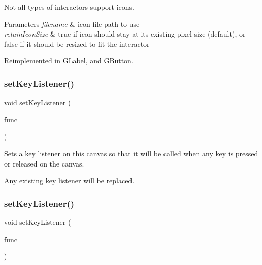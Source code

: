 Not all types of interactors support icons. 
\begin{DoxyParams}{Parameters}
{\em filename} & icon file path to use \\
\hline
{\em retain\+Icon\+Size} & true if icon should stay at its existing pixel size (default), or false if it should be resized to fit the interactor \\
\hline
\end{DoxyParams}


Reimplemented in \mbox{\hyperlink{classGLabel_a75753a3d7d3364185f8088d63b664cb1}{G\+Label}}, and \mbox{\hyperlink{classGButton_a75753a3d7d3364185f8088d63b664cb1}{G\+Button}}.

\mbox{\label{classGCanvas_aeb8324d3287fa1fbe093f4d6230cf0a6}} 
\subsubsection{\texorpdfstring{set\+Key\+Listener()}{setKeyListener()}\hspace{0.1cm}{\footnotesize\ttfamily [1/2]}}
{\footnotesize\ttfamily void set\+Key\+Listener (\begin{DoxyParamCaption}\item[{G\+Event\+Listener}]{func }\end{DoxyParamCaption})\hspace{0.3cm}{\ttfamily [virtual]}}



Sets a key listener on this canvas so that it will be called when any key is pressed or released on the canvas. 

Any existing key listener will be replaced. \mbox{\label{classGCanvas_ae48ecea73606c7bd9423e1c7cc589cc9}} 
\subsubsection{\texorpdfstring{set\+Key\+Listener()}{setKeyListener()}\hspace{0.1cm}{\footnotesize\ttfamily [2/2]}}
{\footnotesize\ttfamily void set\+Key\+Listener (\begin{DoxyParamCaption}\item[{G\+Event\+Listener\+Void}]{func }\end{DoxyParamCaption})\hspace{0.3cm}{\ttfamily [virtual]}}




